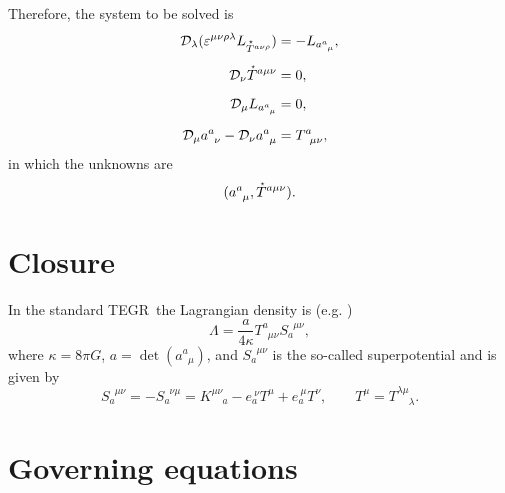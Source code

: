 \documentclass[
10pt, %
a4paper, %
oneside, %
headinclude,footinclude, %
BCOR5mm, %
]{scrartcl}
\newcommand{\itetr}[2]{e^{\ #1}_{#2}}
\newcommand{\tetr}[2]{a^{#1}_{\phantom{#1}#2}}
\newcommand{\D}[1]{\mathcal{D}_{#1}} %
\newcommand{\Tors}[2]{T^{#1}_{\phantom{a}#2}}
\newcommand{\Supp}[2]{S_{#1}^{\phantom{a}#2}}	%
\newcommand{\Laghodge}{L}%
\newcommand{\veps}{\varepsilon}
\newcommand{\tegr}{TEGR}
\newcommand{\HT}[1]{\accentset{\star}{T}^{#1}}
\begin{document}
Therefore, the system to be solved is
\begin{subequations}
	\begin{align}
		\D{\lambda}(\veps^{\mu\nu\rho\lambda}\Laghodge_{\HT{a\nu\rho}}) 
		&=-\Laghodge_{\tetr{a}{\mu}},\\[2mm]
		\D{\nu}\HT{a\mu\nu} &= 0,\\[2mm]
		\D{\mu}\Laghodge_{\tetr{a}{\mu}} &= 0,\\[2mm]
		\D{\mu}\tetr{a}{\nu} - \D{\nu}\tetr{a}{\mu} &= \Tors{a}{\mu\nu},
	\end{align}
\end{subequations}
in which the unknowns are
\begin{equation}
(\tetr{a}{\mu},\HT{a\mu\nu}).
\end{equation}






\section{Closure}



In the standard \tegr\ the Lagrangian density is (e.g. \cite{Krssak2017})
\begin{equation}
\Lambda = \frac{a}{4\kappa} \Tors{a}{\mu\nu}\Supp{a}{\mu\nu},
\end{equation}
where $ \kappa = 8 \pi G $, $ a = \det(\tetr{a}{\mu}) $, and $ \Supp{a}{\mu\nu} $ is the so-called 
superpotential and is given by
\begin{equation}
\Supp{a}{\mu\nu} = -\Supp{a}{\nu\mu} = K^{\mu\nu}_{\phantom{\mu\nu}a} - \itetr{\nu}{a} T^\mu + 
\itetr{\mu}{a} 
T^\nu, \qquad T^\mu = T^{\lambda\mu}_{\phantom{\lambda\mu}\lambda}.
\end{equation}


\section{Governing equations}

\printbibliography
\end{document}
